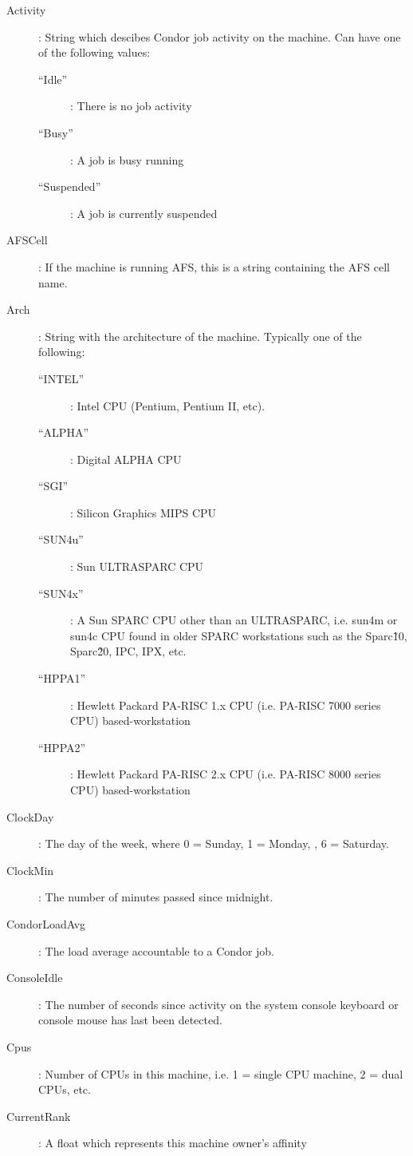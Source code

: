 \begin{description}
%
\item[Activity] : String which descibes Condor job activity on the machine.
Can have one of the following values:
	\begin{description}
	\item[``Idle''] : There is no job activity
	\item[``Busy''] : A job is busy running
	\item[``Suspended''] : A job is currently suspended
	\end{description}
%
\item[AFSCell] : If the machine is running AFS, this is a string
containing the AFS cell name.
%
\item[Arch] : String with the architecture of the machine.  Typically
one of the following: 
	\begin{description}
	\item[``INTEL''] : Intel CPU (Pentium, Pentium II, etc).
	\item[``ALPHA''] : Digital ALPHA CPU
	\item[``SGI''] : Silicon Graphics MIPS CPU
	\item[``SUN4u''] : Sun ULTRASPARC CPU
	\item[``SUN4x''] : A Sun SPARC CPU other than an ULTRASPARC, i.e.
sun4m or sun4c CPU found in older SPARC workstations such as the Sparc\~10, 
Sparc\~20, IPC, IPX, etc.
	\item[``HPPA1''] :  Hewlett Packard PA-RISC 1.x CPU (i.e. PA-RISC    
                      7000 series CPU) based-workstation
	\item[``HPPA2''] :  Hewlett Packard PA-RISC 2.x CPU (i.e. PA-RISC    
                      8000 series CPU) based-workstation
	\end{description}
%
\item[ClockDay] : The day of the week, where 0 = Sunday, 1 = Monday, \Dots, 6 = Saturday. 
%
\item[ClockMin] : The number of minutes passed since midnight.
%
\item[CondorLoadAvg] : The load average accountable to a Condor job.
%
\item[ConsoleIdle] : The number of seconds since activity on the system
console keyboard or console mouse has last been detected.
%
\item[Cpus] : Number of CPUs in this machine, i.e. 1 = single CPU machine, 2 = dual
CPUs, etc.
%
\item[CurrentRank] : A float which represents this machine owner's affinity

\end{description}
